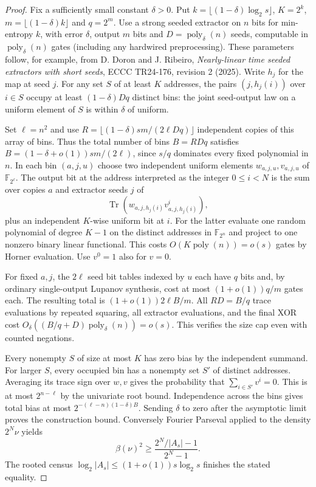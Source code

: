 \begin{proof}
Fix a sufficiently small constant $\delta>0$. Put $k=\lfloor(1-\delta)\log_2s\rfloor$, $K=2^k$, $m=\lfloor(1-\delta)k\rfloor$ and $q=2^m$. Use a strong seeded extractor on $n$ bits for min-entropy $k$, with error $\delta$, output $m$ bits and $D=\operatorname{poly}_\delta(n)$ seeds, computable in $\operatorname{poly}_\delta(n)$ gates (including any hardwired preprocessing). These parameters follow, for example, from D. Doron and J. Ribeiro, \emph{Nearly-linear time seeded extractors with short seeds}, ECCC TR24-176, revision 2 (2025). Write $h_j$ for the map at seed $j$. For any set $S$ of at least $K$ addresses, the pairs $(j,h_j(i))$ over $i\in S$ occupy at least $(1-\delta)Dq$ distinct bins: the joint seed-output law on a uniform element of $S$ is within $\delta$ of uniform.

Set $\ell=n^2$ and use $R=\lfloor (1-\delta)s m/(2\ell Dq)\rfloor$ independent copies of this array of bins. Thus the total number of bins $B=RDq$ satisfies $B=(1-\delta+o(1))sm/(2\ell)$, since $s/q$ dominates every fixed polynomial in $n$. In each bin $(a,j,u)$ choose two independent uniform elements $w_{a,j,u},v_{a,j,u}$ of $\mathbb F_{2^\ell}$. The output bit at the address interpreted as the integer $0\le i<N$ is the sum over copies $a$ and extractor seeds $j$ of
\[
  \operatorname{Tr}(w_{a,j,h_j(i)}v_{a,j,h_j(i)}^i),
\]
plus an independent $K$-wise uniform bit at $i$. For the latter evaluate one random polynomial of degree $K-1$ on the distinct addresses in $\mathbb F_{2^n}$ and project to one nonzero binary linear functional. This costs $O(K\operatorname{poly}(n))=o(s)$ gates by Horner evaluation. Use $v^0=1$ also for $v=0$.

For fixed $a,j$, the $2\ell$ seed bit tables indexed by $u$ each have $q$ bits and, by ordinary single-output Lupanov synthesis, cost at most $(1+o(1))q/m$ gates each. The resulting total is $(1+o(1))2\ell B/m$. All $RD=B/q$ trace evaluations by repeated squaring, all extractor evaluations, and the final XOR cost $O_\delta((B/q+D)\operatorname{poly}_\delta(n))=o(s)$. This verifies the size cap even with counted negations.

Every nonempty $S$ of size at most $K$ has zero bias by the independent summand. For larger $S$, every occupied bin has a nonempty set $S'$ of distinct addresses. Averaging its trace sign over $w,v$ gives the probability that $\sum_{i\in S'}v^i=0$. This is at most $2^{n-\ell}$ by the univariate root bound. Independence across the bins gives total bias at most $2^{-(\ell-n)(1-\delta)B}$. Sending $\delta$ to zero after the asymptotic limit proves the construction bound. Conversely Fourier Parseval applied to the density $2^N\nu$ yields
\[
 \beta(\nu)^2\ge\frac{2^N/|A_s|-1}{2^N-1}.
\]
The rooted census $\log_2|A_s|\le(1+o(1))s\log_2s$ finishes the stated equality.
\end{proof}

